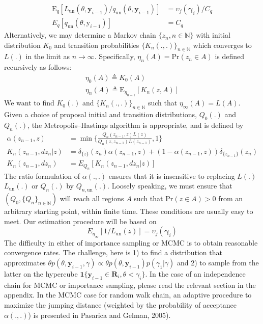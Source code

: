 \documentclass{article}
\begin{document}
\begin{align}
\mathrm{E}_q[L_{\mathrm{un}}(\theta,\mathbf{y}_{i-1})/q_{\mathrm{un}}(\theta,\mathbf{y}_{i-1})]
&=\upsilon_j(\boldsymbol{\gamma}_i)/C_q\\
E_q[q_{\mathrm{un}}(\theta,\mathrm{y}_{i-1})]&=C_q
\end{align}Alternatively, we may determine a Markov chain $\{z_n, n\in
\mathbb{N}\}$ with initial distribution $K_0$ and transition
probabilities $\{K_n(.,.)\}_{n\in \mathbb{N}}$ which converges to
$L(.)$ in the limit as $n\rightarrow \infty$. Specifically,
$\eta_n(A)=\mathrm{Pr}(z_n\in A)$ is defined recursively as follows:
\begin{align}
\eta_0(A)\triangleq K_0(A)\\
\eta_n(A)\triangleq \mathrm{E}_{\eta_{n-1}}[K_n(z,A)]
\end{align}We want to find $K_0(.)$ and $\{K_n(.,.)\}_{n\in \mathbb{N}}$ such that
$\eta_{\infty}(A)=L(A)$. Given a choice of proposal initial and
transition distributions, $Q_0(.)$ and $Q_n(.)$, the
Metropolis--Hastings algorithm is appropriate, and is defined by
\begin{align}
\alpha(z_{n-1},z)&=\min\{\frac{Q_n(z_{n-1},z)L(z)}{Q_n(z,z_{n-1})L(z_{n-1})},1\}\\
K_n(z_{n-1},d{z_n}|z)&=\delta_{\{z\}}(z_n)\alpha(z_{n-1},z)+(1-\alpha(z_{n-1},z))\delta_{\{z_{n-1}\}}(z_n)\\
K_n(z_{n-1},d{z_n})&=E_{Q_n}[K_n(z_{n-1},d{z_n}|z)]
\end{align}The ratio formulation of $\alpha(.,.)$ ensures that it is
insensitive to replacing $L(.)$ $L_{\mathrm{un}}(.)$ or $Q_n(.)$ by
$Q_{n,\mathrm{un}}(.)$. Loosely speaking, we must ensure that
$(Q_0,\{Q_n\}_{n\in\mathbb{N}})$ will reach all regions $A$ such
that $\mathrm{Pr}(z \in A)>0$ from an arbitrary starting point,
within finite time. These conditions are usually easy to meet. Our
estimation procedure will be based on
\begin{equation}
E_{\eta_{\infty}}[1/L_{\mathrm{un}}(z)]=\upsilon_j(\boldsymbol{\gamma}_i)
\end{equation}
The difficulty in either of importance sampling or MCMC is to obtain
reasonable convergence rates. The challenge, here is 1) to find a
distribution that approximates $\theta
p(\theta,\mathbf{y}_{i-1},\gamma)\propto \theta
p(\theta,\mathbf{y}_{i-1})p(\gamma_1|\gamma)$ and 2) to sample from
the latter on the hypercube $\boldsymbol{1}\{\mathbf{y}_{i-1}\in
\mathbf{R}_i, \theta<\gamma_i\}$. In the case of an independence
chain for MCMC or importance sampling, please read the relevant
section in the appendix. In the MCMC case for random walk chain, an
adaptive procedure to maximize the jumping distance (weighted by the
probability of acceptance $\alpha(.,.)$) is presented in Pasarica
and Gelman, 2005).
\end{document}
